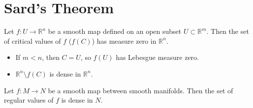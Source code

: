 \section{Sard's Theorem}
\begin{theorem}\label{6.1}
    Let $f: U\to \mathbb{R}^n$ be a smooth map defined on an open subset $U\subset \mathbb{R}^m$. Then the set of critical values of $f$ ($f(C)$) has measure zero in $\mathbb{R}^n$.
\end{theorem}
\begin{remark}\label{6.2}
    \begin{itemize}
        \item If $m<n$, then $C=U$, so $f(U)$ has Lebesgue measure zero.
        \item $\mathbb{R}^n\setminus f(C)$ is dense in $\mathbb{R}^n$.
    \end{itemize}
\end{remark}
\begin{corollary}\label{6.3}
    Let $f: M\to N$ be a smooth map between smooth manifolds. Then the set of regular values of $f$ is dense in $N$.
\end{corollary}
